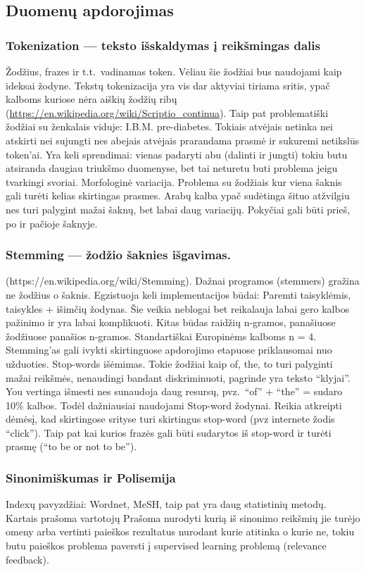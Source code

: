 \documentclass{VUMIFInfKursinis}
\begin{document}
\subsection{Duomenų apdorojimas}
\subsubsection{Tokenization --- teksto išskaldymas į reikšmingas dalis}
Žodžius, frazes ir t.t.\  vadinamas token. Vėliau šie žodžiai bus naudojami kaip ideksai žodyne. Tekstų tokenizacija yra vis dar aktyviai tiriama sritis, ypač kalboms kuriose nėra aiškių žodžių ribų (\url{https://en.wikipedia.org/wiki/Scriptio_continua}). Taip pat problematiški žodžiai su ženkalais viduje: I.B.M.\; pre-diabetes. Tokiais atvėjais netinka nei atskirti nei sujungti nes abejais atvėjais prarandama prasmė ir sukuremi netikslūs token’ai. Yra keli sprendimai: vienas padaryti abu (dalinti ir jungti) tokiu butu atsiranda daugiau triukšmo duomenyse, bet tai neturetu buti problema jeigu tvarkingi svoriai. 
Morfologinė variacija. Problema su žodžiais kur viena šaknis gali turėti kelias skirtingas prasmes. Arabų kalba ypač sudėtinga šituo atžvilgiu nes turi palygint mažai šaknų, bet labai daug variacijų. Pokyčiai gali būti prieš, po ir pačioje šaknyje.

\subsubsection{Stemming --- žodžio šaknies išgavimas.}
(https://en.wikipedia.org/wiki/Stemming). Dažnai programos (stemmers) gražina ne žodžius o šaknis. Egzistuoja keli implementacijos būdai: Paremti taisyklėmis, taisykles + išimčių žodynas. Šie veikia neblogai bet reikalauja labai gero kalbos pažinimo ir yra labai komplikuoti. Kitas būdas raidžių n-gramos, panašiuose žodžiuose panašios n-gramos. Standartiškai Europinėms kalboms n = 4. Stemming’as gali ivykti skirtinguose apdorojimo etapuose priklausomai nuo užduoties.
Stop-words išėmimas. Tokie žodžiai kaip of, the, to turi palyginti mažai reikšmės, nenaudingi bandant diskriminuoti, pagrinde yra teksto “klyjai”. You vertinga išmesti nes sunaudoja daug resursų, pvz.\ “of” + “the” = sudaro 10\% kalbos. Todėl dažniausiai naudojami Stop-word žodynai. Reikia atkreipti dėmėsį, kad skirtingose srityse turi skirtingus stop-word (pvz internete žodis “click”). Taip pat kai kurios frazės gali būti sudarytos iš stop-word ir turėti prasmę (“to be or not to be”).

\subsubsection{Sinonimiškumas ir Polisemija}
Indexų pavyzdžiai: Wordnet, MeSH, taip pat yra daug statistinių metodų. Kartais prašoma vartotojų Prašoma nurodyti kurią iš sinonimo reikšmių jie turėjo omeny arba vertinti paieškos rezultatus nurodant kurie atitinka o kurie ne, tokiu butu paieškos problema paversti į supervised learning problemą (relevance feedback).
\end{document}

